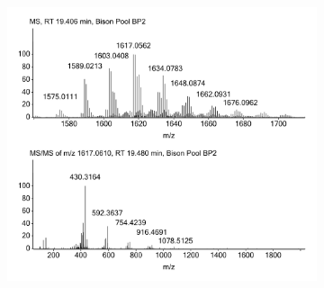 \begin{figure}[h]
\centering
    \begin{subfigure}[b]{1\linewidth}
       \includegraphics[width=\linewidth]{figs_app1/3G-NAcG-G_1}
       \caption{}
        \label{fig:3G-NAcG-G-MS}
    \end{subfigure}
\end{figure}
\newpage
